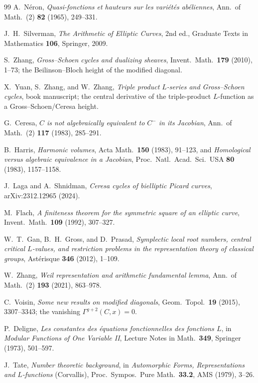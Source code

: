 \documentclass[11pt]{article}
\theoremstyle{definition}
\theoremstyle{remark}
\begin{document}
\begin{thebibliography}{99}
 A.~N\'eron, \emph{Quasi-fonctions et hauteurs sur les
vari\'et\'es ab\'eliennes}, Ann.\ of Math.\ (2) \textbf{82} (1965), 249--331.

 J.~H.~Silverman, \emph{The Arithmetic of Elliptic Curves},
2nd ed., Graduate Texts in Mathematics \textbf{106}, Springer, 2009.

 S.~Zhang, \emph{Gross--Schoen cycles and dualizing sheaves},
Invent.\ Math.\ \textbf{179} (2010), 1--73; the Beilinson--Bloch height of the
modified diagonal.

 X.~Yuan, S.~Zhang, and W.~Zhang, \emph{Triple product
$L$-series and Gross--Schoen cycles}, book manuscript; the central derivative
of the triple-product $L$-function as a Gross--Schoen/Ceresa height.

 G.~Ceresa, \emph{$C$ is not algebraically equivalent to
$C^-$ in its Jacobian}, Ann.\ of Math.\ (2) \textbf{117} (1983), 285--291.

 B.~Harris, \emph{Harmonic volumes}, Acta Math.\ \textbf{150}
(1983), 91--123, and \emph{Homological versus algebraic equivalence in a
Jacobian}, Proc.\ Natl.\ Acad.\ Sci.\ USA \textbf{80} (1983), 1157--1158.

 J.~Laga and A.~Shnidman, \emph{Ceresa cycles of
bielliptic Picard curves}, arXiv:2312.12965 (2024).

 M.~Flach, \emph{A finiteness theorem for the symmetric square
of an elliptic curve}, Invent.\ Math.\ \textbf{109} (1992), 307--327.

 W.~T.~Gan, B.~H.~Gross, and D.~Prasad, \emph{Symplectic local
root numbers, central critical $L$-values, and restriction problems in the
representation theory of classical groups}, Ast\'erisque \textbf{346} (2012),
1--109.

 W.~Zhang, \emph{Weil representation and arithmetic
fundamental lemma}, Ann.\ of Math.\ (2) \textbf{193} (2021), 863--978.

 C.~Voisin, \emph{Some new results on modified diagonals},
Geom.\ Topol.\ \textbf{19} (2015), 3307--3343; the vanishing
$\Gamma^{g+2}(C,x)=0$.

 P.~Deligne, \emph{Les constantes des \'equations
fonctionnelles des fonctions $L$}, in \emph{Modular Functions of One Variable
II}, Lecture Notes in Math.\ \textbf{349}, Springer (1973), 501--597.

 J.~Tate, \emph{Number theoretic background}, in
\emph{Automorphic Forms, Representations and $L$-functions} (Corvallis),
Proc.\ Sympos.\ Pure Math.\ \textbf{33.2}, AMS (1979), 3--26.


\end{thebibliography}
\end{document}

